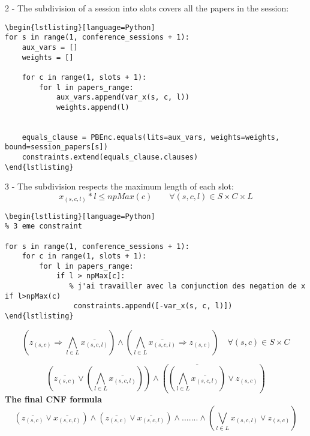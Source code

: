 \documentclass{article}
\begin{document}
2 - The subdivision of a session into slots covers all the papers in the session:



\begin{verbatim}
\begin{lstlisting}[language=Python]
for s in range(1, conference_sessions + 1):
    aux_vars = []  
    weights = []   

    for c in range(1, slots + 1):
        for l in papers_range:
            aux_vars.append(var_x(s, c, l))
            weights.append(l)  

   
    equals_clause = PBEnc.equals(lits=aux_vars, weights=weights, bound=session_papers[s])
    constraints.extend(equals_clause.clauses)
\end{lstlisting}
\end{verbatim}

3 - The subdivision respects the maximum length of each slot:
$$ x_{(s,c,l)}*l \leq npMax(c)\qquad \forall (s,c,l)\in S\times C\times L $$

\begin{verbatim}
\begin{lstlisting}[language=Python]
% 3 eme constraint

for s in range(1, conference_sessions + 1):
    for c in range(1, slots + 1):
        for l in papers_range:
            if l > npMax[c]:
               % j'ai travailler avec la conjunction des negation de x if l>npMax(c)
                constraints.append([-var_x(s, c, l)])
\end{lstlisting}
\end{verbatim}

$$ \left( z_{(s,c)} \Longrightarrow \bigwedge_{l\in L} \overline{x_{(s,c,l)}} \right) \wedge \left( \bigwedge_{l\in L} \overline{x_{(s,c,l)}} \Longrightarrow z_{(s,c)} \right) \quad \forall (s,c)\in S\times C $$

$$\left(\overline{z_{(s,c)}} \vee \left(\bigwedge_{l\in L} \overline{x_{(s,c,l)}}\right) \right)\wedge \left( \overline{\left(\bigwedge_{l\in L} \overline{x_{(s,c,l)}}\right)} \vee z_{(s,c)} \right)  $$
\textbf{The final CNF formula}\\
$$\left(\overline{z_{(s,c)}} \vee \overline{x_{(s,c,l)}}\right)
 \wedge \left(\overline{z_{(s,c)}} \vee \overline{x_{(s,c,l)}}\right)\wedge ....... \wedge \left(\bigvee_{l\in L} x_{(s,c,l)} \vee z_{(s,c)}\right)$$
 
\end{document}
